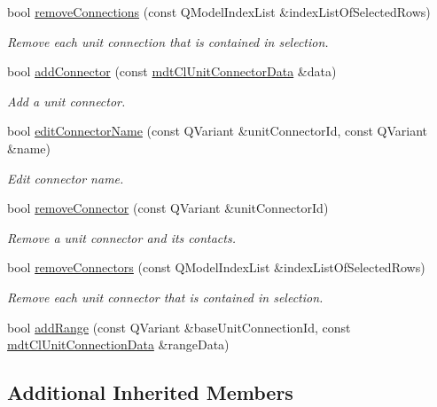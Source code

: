 \begin{DoxyCompactItemize}
bool \hyperlink{classmdt_cl_unit_a55db63f5cdc0185dbf84466f18414118}{remove\-Connections} (const Q\-Model\-Index\-List \&index\-List\-Of\-Selected\-Rows)
\begin{DoxyCompactList}\small\item\em Remove each unit connection that is contained in selection. \end{DoxyCompactList}\item 
bool \hyperlink{classmdt_cl_unit_acafdba8ebc2f5044b096282ecc41da41}{add\-Connector} (const \hyperlink{classmdt_cl_unit_connector_data}{mdt\-Cl\-Unit\-Connector\-Data} \&data)
\begin{DoxyCompactList}\small\item\em Add a unit connector. \end{DoxyCompactList}\item 
bool \hyperlink{classmdt_cl_unit_a7bb1ff9cc5469f45dbf244fd26d60329}{edit\-Connector\-Name} (const Q\-Variant \&unit\-Connector\-Id, const Q\-Variant \&name)
\begin{DoxyCompactList}\small\item\em Edit connector name. \end{DoxyCompactList}\item 
bool \hyperlink{classmdt_cl_unit_a86244b8f9b2ff41c05b32749c038813d}{remove\-Connector} (const Q\-Variant \&unit\-Connector\-Id)
\begin{DoxyCompactList}\small\item\em Remove a unit connector and its contacts. \end{DoxyCompactList}\item 
bool \hyperlink{classmdt_cl_unit_a5865c061516caf7d04b7569eba47c3af}{remove\-Connectors} (const Q\-Model\-Index\-List \&index\-List\-Of\-Selected\-Rows)
\begin{DoxyCompactList}\small\item\em Remove each unit connector that is contained in selection. \end{DoxyCompactList}\item 
bool \hyperlink{classmdt_cl_unit_a35a35f22daf4a408f5400031c12ce3cf}{add\-Range} (const Q\-Variant \&base\-Unit\-Connection\-Id, const \hyperlink{classmdt_cl_unit_connection_data}{mdt\-Cl\-Unit\-Connection\-Data} \&range\-Data)
\end{DoxyCompactItemize}
\subsection*{Additional Inherited Members}


